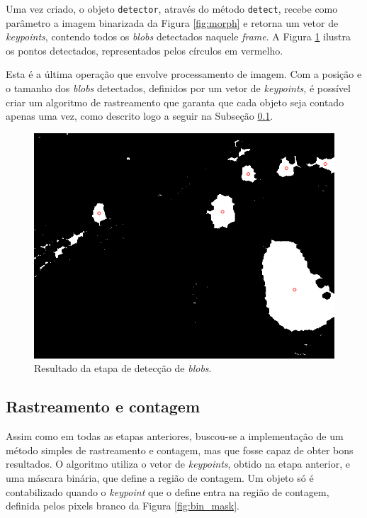 Uma vez criado, o objeto \verb!detector!, através do método \verb!detect!, recebe como parâmetro a imagem binarizada da Figura \ref{fig:morph} e retorna um vetor de \textit{keypoints}, contendo todos os \textit{blobs} detectados naquele \textit{frame}. A Figura \ref{fig:keypoints} ilustra os pontos detectados, representados pelos círculos em vermelho. 

Esta é a última operação que envolve processamento de imagem. Com a posição e o tamanho dos \textit{blobs} detectados, definidos por um vetor de \textit{keypoints}, é possível criar um algoritmo de rastreamento que garanta que cada objeto seja contado apenas uma vez, como descrito logo a seguir na Subseção \ref{sub:rastreamento_e_contagem}.

\begin{figure}[ht]
  \begin{center}
    \includegraphics[scale=0.5]{imgs/keypoints.png}
  \end{center}
  \caption{Resultado da etapa de detecção de \textit{blobs}.}
  \label{fig:keypoints}
\end{figure}


\subsection{Rastreamento e contagem} %
\label{sub:rastreamento_e_contagem}

Assim como em todas as etapas anteriores, buscou-se a implementação de um método simples de rastreamento e contagem, mas que fosse capaz de obter bons resultados. O algoritmo utiliza o vetor de \textit{keypoints}, obtido na etapa anterior, e uma máscara binária, que define a região de contagem. Um objeto só é contabilizado quando o \textit{keypoint} que o define entra na região de contagem, definida pelos pixels branco da Figura \ref{fig:bin_mask}.

